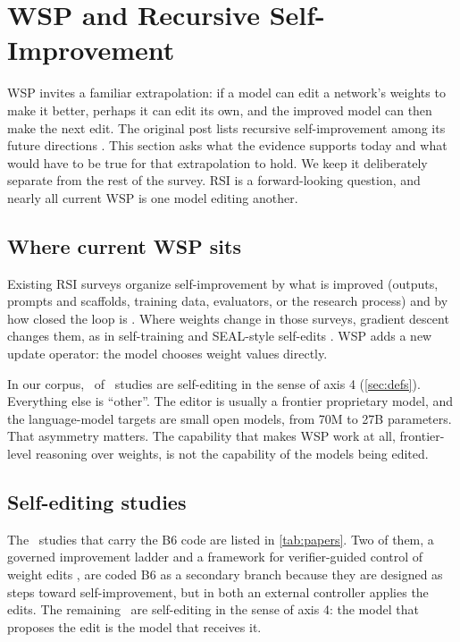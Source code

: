 \section{WSP and Recursive Self-Improvement}
\label{sec:rsi}

WSP invites a familiar extrapolation: if a model can edit a network's weights to make it better, perhaps it can edit its own, and the improved model can then make the next edit. The original post lists recursive self-improvement among its future directions \citep{takehi2026sparks}. This section asks what the evidence supports today and what would have to be true for that extrapolation to hold. We keep it deliberately separate from the rest of the survey. RSI is a forward-looking question, and nearly all current WSP is one model editing another.

\subsection{Where current WSP sits}

Existing RSI surveys organize self-improvement by what is improved (outputs, prompts and scaffolds, training data, evaluators, or the research process) and by how closed the loop is \citep{ax2607_13104,ax2607_07663,liu2026pathrsi,wu2026rsisurvey}. Where weights change in those surveys, gradient descent changes them, as in self-training and SEAL-style self-edits \citep{ax2506_10943,ax2601_14532}. WSP adds a new update operator: the model chooses weight values directly.

In our corpus, \nSelfEditing\ of \nIncluded\ studies are self-editing in the sense of axis 4 (\cref{sec:defs}). Everything else is ``other''. The editor is usually a frontier proprietary model, and the language-model targets are small open models, from 70M to 27B parameters. That asymmetry matters. The capability that makes WSP work at all, frontier-level reasoning over weights, is not the capability of the models being edited.

\subsection{Self-editing studies}

The \nAnyBSix\ studies that carry the B6 code are listed in \cref{tab:papers}. Two of them, a governed improvement ladder \citep{ax2611_10425} and a framework for verifier-guided control of weight edits \citep{ax2611_13236}, are coded B6 as a secondary branch because they are designed as steps toward self-improvement, but in both an external controller applies the edits. The remaining \nSelfEditing\ are self-editing in the sense of axis 4: the model that proposes the edit is the model that receives it.

